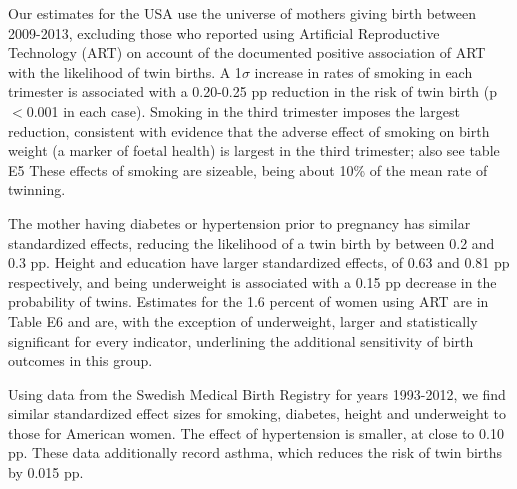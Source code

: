 \documentclass{nature}
\begin{document}
\begin{linenumbers}
Our estimates for the USA use the universe of mothers giving birth between 2009-2013, excluding those who reported using Artificial Reproductive Technology (ART) on account of the documented positive association of ART with the likelihood of twin births\cite{Vitthalaetal2009}. A 1$\sigma$ increase in rates of smoking in each trimester is associated with a 0.20-0.25 pp reduction in the risk of twin birth (p$<$0.001 in each case). Smoking in the third trimester imposes the largest reduction, consistent with evidence that the adverse effect of smoking on birth weight (a marker of foetal health) is largest in the third trimester\cite{Bernsteinetal2005}; also see table E5 %
These effects of smoking are sizeable, being about 10\% of the mean rate of twinning. 


The mother having diabetes or hypertension prior to pregnancy has similar standardized effects, reducing the likelihood of a twin birth by between 0.2 and 0.3 pp. Height and education have larger standardized effects, of 0.63 and 0.81 pp respectively, and being underweight is associated with a 0.15 pp decrease in the probability of twins. Estimates for the 1.6 percent of women using ART are in Table E6 and are, with the exception of underweight, larger and statistically significant for every indicator, underlining the additional sensitivity of birth outcomes in this group. 


Using data from the Swedish Medical Birth Registry for years 1993-2012, we find similar standardized effect sizes for smoking, diabetes, height and underweight to those for American women. The effect of hypertension is smaller, at close to 0.10 pp. These data additionally record asthma, which reduces the risk of twin births by 0.015 pp. %


\end{linenumbers}
\end{document}
